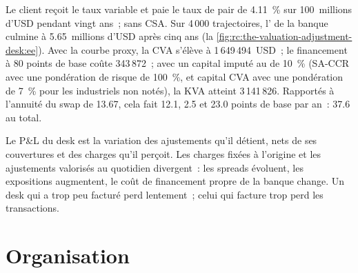 \begin{example}\label{ex:rc:the-valuation-adjustment-desk:quote}
Le client reçoit le taux variable et paie le taux de pair de 4.11~\% sur 100~millions d'USD pendant
vingt ans~; sans CSA. Sur 4\,000 trajectoires, l' de la banque culmine à 5.65~millions d'USD après
cinq ans (la \cref{fig:rc:the-valuation-adjustment-desk:ee}). Avec la courbe proxy, la CVA s'élève à
1\,649\,494~USD~; le financement à 80 points de base coûte 343\,872~; avec un capital imputé au  de 10~\%
(SA-CCR avec une pondération de risque de 100~\%, et capital CVA avec une pondération de 7~\% pour les
industriels non notés), la KVA atteint 3\,141\,826. Rapportés à l'annuité du swap de 13.67, cela fait 12.1, 2.5 et 23.0
points de base par an~: 37.6 au total.
\end{example}

\begin{omfigure}

\label{fig:rc:the-valuation-adjustment-desk:ee}
\end{omfigure}

Le P\&L du desk est la variation des ajustements qu'il détient, nets de ses couvertures et des
charges qu'il perçoit. Les charges fixées à l'origine et les ajustements valorisés au quotidien divergent~: les spreads
évoluent, les expositions augmentent, le coût de financement propre de la banque change. Un desk qui a trop peu facturé
perd lentement~; celui qui facture trop perd les transactions.

\section{Organisation}


